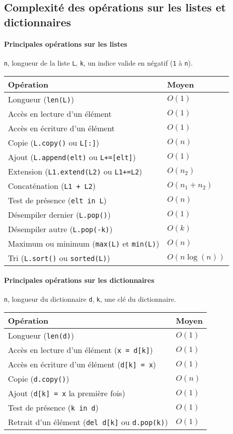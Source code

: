 \subsection*{Complexité des opérations sur les listes et dictionnaires}

\paragraph*{Principales opérations sur les listes}

\texttt{n}, longueur de la liste \texttt{L}, \texttt{k}, un indice valide en négatif (\texttt{1} à \texttt{n}).

\begin{longtable}{|m{9cm}|m{2.1cm}|} \hline
	\bf \centering Opération & \bf \centering Moyen \tabularnewline
	\hline
	\endhead
	Longueur (\texttt{len(L)}) &  $O(1)$ \tabularnewline
	\hline
	Accès en lecture d'un élément &  $O(1)$ \tabularnewline
	\hline
	Accès en écriture d'un élément &  $O(1)$ \tabularnewline
	\hline
	Copie (\texttt{L.copy()} ou \texttt{L[:]}) & $O(n)$ \tabularnewline
	\hline
	Ajout (\texttt{L.append(elt)} ou \texttt{L+=[elt]}) & $O(1)$ \tabularnewline
	\hline
	Extension (\texttt{L1.extend(L2)} ou \texttt{L1+=L2}) & $O(n_2)$ \tabularnewline
	\hline
	Concaténation (\texttt{L1 + L2}) &  $O(n_1 + n_2)$ \tabularnewline
	\hline
	Test de présence (\texttt{elt in L}) & $O(n)$ \tabularnewline
	\hline
	Désempiler dernier (\texttt{L.pop()}) &  $O(1)$ \tabularnewline
	\hline
	Désempiler autre (\texttt{L.pop(-k)}) &  $O(k)$ \tabularnewline
	\hline
	Maximum ou minimum (\texttt{max(L)} et \texttt{min(L)}) &  $O(n)$ \tabularnewline
	\hline
	Tri (\texttt{L.sort()} ou \texttt{sorted(L)}) &  $O(n \log(n))$ \tabularnewline
	\hline
\end{longtable}

\paragraph*{Principales opérations sur les dictionnaires}

\texttt{n}, longueur du dictionnaire \texttt{d}, \texttt{k}, une clé du dictionnaire.

\begin{longtable}{|m{9cm}|m{2.1cm}|} \hline
	\bf \centering Opération & \bf \centering Moyen \tabularnewline
	\hline
	\endhead
	Longueur (\texttt{len(d)}) &  $O(1)$ \tabularnewline
	\hline
	Accès en lecture d'un élément (\texttt{x = d[k]})  &  $O(1)$ \tabularnewline
	\hline
	Accès en écriture d'un élément (\texttt{d[k] = x}) &  $O(1)$ \tabularnewline
	\hline
	Copie (\texttt{d.copy()}) & $O(n)$ \tabularnewline
	\hline
	Ajout (\texttt{d[k] = x} la première fois) & $O(1)$ \tabularnewline
	\hline
	Test de présence (\texttt{k in d}) & $O(1)$ \tabularnewline
	\hline
	Retrait d'un élément (\texttt{del d[k]} ou \texttt{d.pop(k)}) & $O(1)$ \tabularnewline
	\hline
\end{longtable}

 


